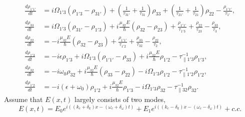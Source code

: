 \documentclass[10pt,letterpaper]{article}
\begin{document}
	\begin{subequations}
		\label{subeq:DM}
		\begin{align}
		\frac{d \rho_{1'1'}}{d t} &= i\Omega_{1'3} (\rho_{1'3} - \rho_{31'}) + (\frac{1}{\tau_{31'}}  + \frac{1}{\tau_{31}})\rho_{33} + (\frac{1}{\tau_{21'}}   +\frac{1}{\tau_{21}})\rho_{22} - \frac{\rho_{1'1'}}{\tau_{1'}} ,  \label{eq:vonNeumannexpandedstart}\\ 
		\frac{d \rho_{33}}{d t}   &= i\Omega_{1'3} (\rho_{31'} - \rho_{1'3}) + i\frac{\mu_{32} E}{\hbar} (\rho_{32}-\rho_{23}) + \frac{ \rho_{1'1'}}{\tau_{1'3}} +
		\frac{\rho_{22}}{\tau_{23}} - \frac{\rho_{33}}{\tau_{3}},  \\
		\frac{d \rho_{22}}{d t}   &=- i\frac{\mu_{32} E}{\hbar} (\rho_{32}-\rho_{23}) +\frac{\rho_{1'1'}}{\tau_{1'2}}  + \frac{\rho_{33}}{\tau_{32}} - \frac{\rho_{22}}{\tau_{2}} , \\
		\frac{d \rho_{1'3}}{d t}  &= -i\epsilon\rho_{1'3} +i \Omega_{1'3}(\rho_{1'1'} - \rho_{33}) +i\frac{\mu_{32}E}{\hbar}\rho_{1'2} -\tau_{\parallel 1'3}^{-1}\rho_{1'3}, \\
		\frac{d \rho_{32}}{d t}   &= -i\omega_{0}\rho_{32} +i \frac{\mu_{32}E}{\hbar}(\rho_{33}-\rho_{22}) -i\Omega_{1'3}\rho_{1'2} -\tau_{\parallel 1'2}^{-1}\rho_{1'2},   \\
		\frac{d \rho_{1'2}}{d t}  &= -i(\epsilon+\omega_0)\rho_{1'2} +i\frac{\mu_{32}E}{\hbar}\rho_{1'3} -i\Omega_{1'3}\rho_{32} -\tau_{\parallel 32}^{-1}\rho_{32} . \label{eq:vonNeumannexpandedend}
		\end{align}
	\end{subequations}
	Assume that $E(x,t)$ largely consists of two modes, 
	$$
	E(x,t) = E_0e^{i((k_c+\delta_k )x -  (\omega_c+\delta_\omega)t)} +E_1e^{i((k_c-\delta_k )x -  (\omega_c-\delta_\omega)t)} + c.c.  
	$$
\end{document}
